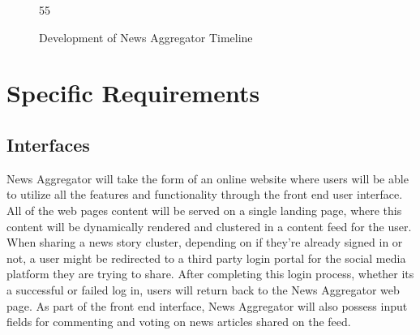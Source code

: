 \documentclass[onecolumn, draftclsnofoot,10pt, compsoc]{IEEEtran}
\begin{document}
\begin{figure}[h!]
    \begin{flushright}
        \begin{PstGanttChart}[unit=2,ChartShowIntervals,ChartUnitIntervalName=Month,ChartUnitBasicIntervalName=Month]{5}{5}
        \end{PstGanttChart}
        \caption{Development of News Aggregator Timeline}
        \label{fig:timeline}
    \end{flushright}
\end{figure}

\section{Specific Requirements}
\subsection{Interfaces}
News Aggregator will take the form of an online website where users will be able to utilize all the features and functionality through the front end user interface. All of the web pages content will be served on a single landing page, where this content will be dynamically rendered and clustered in a content feed for the user. When sharing a news story cluster, depending on if they’re already signed in or not, a user might be redirected to a third party login portal for the social media platform they are trying to share. After completing this login process, whether its a successful or failed log in, users will return back to the News Aggregator web page. As part of the front end interface, News Aggregator will also possess input fields for commenting and voting on news articles shared on the feed.
\end{document}

